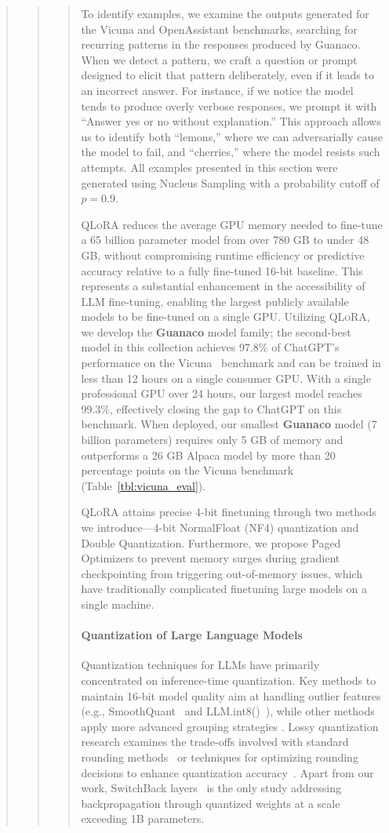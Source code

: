 \begin{quote}
\begin{quote}
\begin{quote}
To identify examples, we examine the outputs generated for the Vicuna and OpenAssistant benchmarks, searching for recurring patterns in the responses produced by {Guanaco}. When we detect a pattern, we craft a question or prompt designed to elicit that pattern deliberately, even if it leads to an incorrect answer. For instance, if we notice the model tends to produce overly verbose responses, we prompt it with ``Answer yes or no without explanation.'' This approach allows us to identify both ``lemons,'' where we can adversarially cause the model to fail, and ``cherries,'' where the model resists such attempts. All examples presented in this section were generated using Nucleus Sampling \cite{holtzmancurious} with a probability cutoff of $p=0.9$.

\textsc{QLoRA} reduces the average GPU memory needed to fine-tune a 65 billion parameter model from over 780 GB to under 48 GB, without compromising runtime efficiency or predictive accuracy relative to a fully fine-tuned 16-bit baseline. This represents a substantial enhancement in the accessibility of LLM fine-tuning, enabling the largest publicly available models to be fine-tuned on a single GPU. Utilizing \textsc{QLoRA}, we develop the \textbf{Guanaco} model family; the second-best model in this collection achieves 97.8\% of ChatGPT's performance on the Vicuna~\citep{vicuna2023} benchmark and can be trained in less than 12 hours on a single consumer GPU. With a single professional GPU over 24 hours, our largest model reaches 99.3\%, effectively closing the gap to ChatGPT on this benchmark. When deployed, our smallest \textbf{Guanaco} model (7 billion parameters) requires only 5 GB of memory and outperforms a 26 GB Alpaca model by more than 20 percentage points on the Vicuna benchmark (Table~\ref{tbl:vicuna_eval}).

\textsc{QLoRA} attains precise 4-bit finetuning through two methods we introduce—4-bit NormalFloat (NF4) quantization and Double Quantization. Furthermore, we propose Paged Optimizers to prevent memory surges during gradient checkpointing from triggering out-of-memory issues, which have traditionally complicated finetuning large models on a single machine.

\paragraph{Quantization of Large Language Models} Quantization techniques for LLMs have primarily concentrated on inference-time quantization. Key methods to maintain 16-bit model quality aim at handling outlier features (e.g., SmoothQuant~\citep{xiao2022smoothquant} and LLM.int8()~\citep{dettmers2022llm}), while other methods apply more advanced grouping strategies \citep{park2022nuqmm, yao2022zeroquant}. Lossy quantization research examines the trade-offs involved with standard rounding methods~\citep{dettmers2022case,zeng2022glm,pope2022efficiently} or techniques for optimizing rounding decisions to enhance quantization accuracy~\citep{frantar2022gptq}. Apart from our work, SwitchBack layers~\citep{wortsman2023stable} is the only study addressing backpropagation through quantized weights at a scale exceeding 1B parameters.


\end{quote}
\end{quote}
\end{quote}
